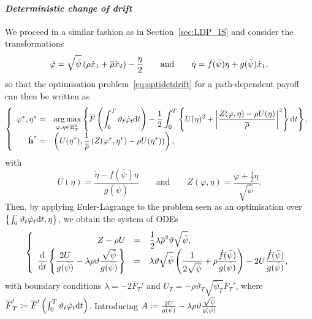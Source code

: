 \paragraph{\textit{Deterministic change of drift}}
We proceed in a similar fashion as in Section~\ref{sec:LDP_IS} and consider the  transformations
$$
\dot{\varphi} = \sqrt{\bar\psi}\left( \rho\dot{x}_1 + \overline{\rho}\dot{x}_2 \right) - \frac{\eta}{2} \qquad \text{and} \qquad \dot{\eta} = \dot{f}(\bar\psi)\eta + g(\bar\psi)\dot{x}_1,
$$
so that the optimisation problem~\eqref{eq:optidetdrift} for a path-dependent payoff can then be written as
\begin{equation}\label{eq:optidetdriftapplication}
\left\{
\begin{array}{rl}
\varphi^{*}, \eta^{*} = & \displaystyle  \operatorname*{arg\,max}\limits_{\varphi,\eta \in \mathbb{H}_T^0} \left\{ \overline{F}\left(\int_0^T \vartheta_t \dot{\varphi}_t \mathrm{d} t \right) 
- \frac{1}{2}\int_0^T \left\{U(\eta)^2 + \left|\frac{Z(\varphi,\eta) - \rho U(\eta)}{\overline{\rho}}\right|^2\right \}\mathrm{d} t \right\},\\
\dot{\boldsymbol{\mathrm{h}}}^{*}  = & \displaystyle 
\left(U(\eta^{*}),  \frac{1}{\overline{\rho}}\left(Z(\varphi^{*}, \eta^{*}) - \rho U(\eta^{*})\right)\right),
\end{array}
\right.
\end{equation}
with
$$
U(\eta) = \frac{\dot{\eta} - \dot{f}(\bar\psi)\eta}{g(\bar\psi)}
\qquad\text{and}\qquad
Z(\varphi, \eta) = \frac{\dot{\varphi} + \frac{1}{2}\eta}{\sqrt{\bar\psi}}. 
$$
Then, by applying Euler-Lagrange to the problem seen as an optimisation over $\left \{\int_0^\cdot \vartheta_t\dot{\varphi}_t\mathrm{d} t,\eta\right \}$, we obtain the system of ODEs
\begin{equation*}
\left\{
\begin{array}{rcl}
Z - \rho U &=& \displaystyle \frac{1}{2}\lambda\overline{\rho}^2\vartheta \sqrt{\bar\psi},\\
\displaystyle \frac{\mathrm{d}}{\mathrm{d} t}\left\{\frac{2U}{g(\bar\psi)} - \lambda \rho \vartheta \frac{\sqrt{\bar\psi}}{g(\bar\psi)}\right\} &=& \displaystyle \lambda \vartheta \sqrt{\bar\psi} \left(\frac{1}{2\sqrt{\bar\psi}} + \rho \frac{\dot{f}(\bar\psi)}{g(\bar\psi)} \right) -2U\frac{\dot{f}(\bar\psi)}{g(\bar\psi)},
\end{array}
\right.
\end{equation*}
with boundary conditions $\lambda = - 2\overline{F}_T'$ and $U_T = -\rho\vartheta_T\sqrt{\bar\psi_T}\overline{F}_T'$, where $\overline{F}_T'\coloneqq \overline{F}'\left(\int_0^T\vartheta_t\dot{\varphi}_t\mathrm{d} t\right)$. 
Introducing
$A \coloneqq \frac{2U}{g(\bar\psi)} - \lambda \rho \vartheta \frac{\sqrt{\bar\psi}}{g(\bar\psi)}$
